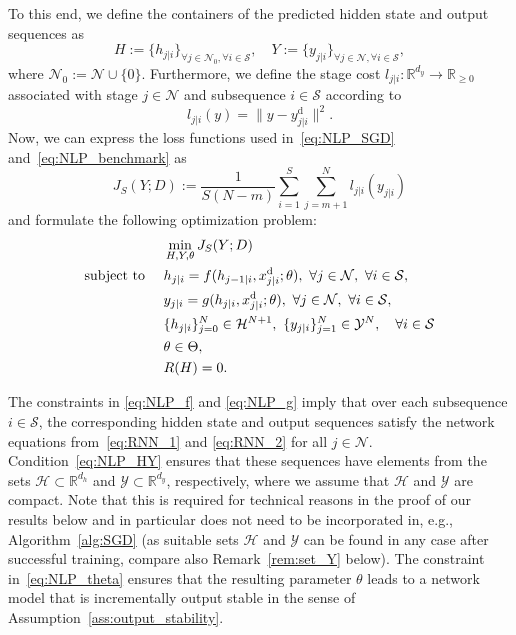 \documentclass{article} %
\begin{document}
To this end, we define the containers of the predicted hidden state and output sequences as
\begin{equation}\label{eq:HY_def}
	H:=\{{h}_{j|i}\}_{\forall j\in\mathcal{N}_0,\forall i\in\mathcal{S}}, \quad Y:=\{{y}_{j|i}\}_{\forall j\in\mathcal{N},\forall i\in\mathcal{S}},
\end{equation}
where $\mathcal{N}_0:=\mathcal{N}\cup\{0\}$.
Furthermore, we define the stage cost $l_{j|i}:\mathbb{R}^{d_y}\rightarrow\mathbb{R}_{\geq0}$ associated with stage $j\in\mathcal{N}$ and subsequence $i\in\mathcal{S}$ according to
\begin{equation}\label{eq:stage_cost}
	l_{j|i}({y}) = \|{y}-y^\mathrm{d}_{j|i}\|^2.
\end{equation}
Now, we can express the loss functions used in~\eqref{eq:NLP_SGD} and~\eqref{eq:NLP_benchmark} as
\begin{equation}\label{eq:NLP_cost}
	 J_S(Y;D) := \frac{1}{S(N-m)}\sum_{i=1}^{S}\sum_{j=m+1}^N l_{j|i}(y_{j|i})
\end{equation}
and formulate the following optimization problem:
\begin{subequations}
	\label{eq:NLP}
	\begin{align}
		&\min\limits_{H,Y,\theta} J_S(Y;D) \label{eq:NLP_min}\\
		\text{subject to \quad }
		&{h}_{j|i} = f(h_{j-1|i},x_{j|i}^\mathrm{d};\theta), \ \forall j\in\mathcal{N}, \ \forall i\in\mathcal{S}, \label{eq:NLP_f}\\
		& y_{j|i} = g(h_{j|i},x_{j|i}^\mathrm{d};\theta), \ \forall j\in\mathcal{N}, \ \forall i\in\mathcal{S},\label{eq:NLP_g}\\
		& \{h_{j|i}\}_{j=0}^N \in\mathcal{H}^{N+1}, \ \{y_{j|i}\}_{j=1}^N\in\mathcal{Y}^N, \quad \forall i\in\mathcal{S} \label{eq:NLP_HY}\\
		& \theta\in \Theta, \label{eq:NLP_theta}\\
		&R(H)=0. \label{eq:NLP_h}
	\end{align}
\end{subequations}

The constraints in \eqref{eq:NLP_f} and \eqref{eq:NLP_g} imply that over each subsequence $i\in\mathcal{S}$, the corresponding hidden state and output sequences satisfy the network equations from~\eqref{eq:RNN_1} and \eqref{eq:RNN_2} for all $j\in\mathcal{N}$.
Condition~\eqref{eq:NLP_HY} ensures that these sequences have elements from the sets $\mathcal{H}\subset\mathbb{R}^{d_h}$ and $\mathcal{Y}\subset\mathbb{R}^{d_y}$, respectively, where we assume that $\mathcal{H}$ and $\mathcal{Y}$ are compact. Note that this is required for technical reasons in the proof of our results below and in particular does not need to be incorporated in, e.g., Algorithm~\ref{alg:SGD} (as suitable sets $\mathcal{H}$ and $\mathcal{Y}$ can be found in any case after successful training, compare also Remark~\ref{rem:set_Y} below).
The constraint in~\eqref{eq:NLP_theta} ensures that the resulting parameter $\theta$ leads to a network model that is incrementally output stable in the sense of Assumption~\ref{ass:output_stability}.
\end{document}
